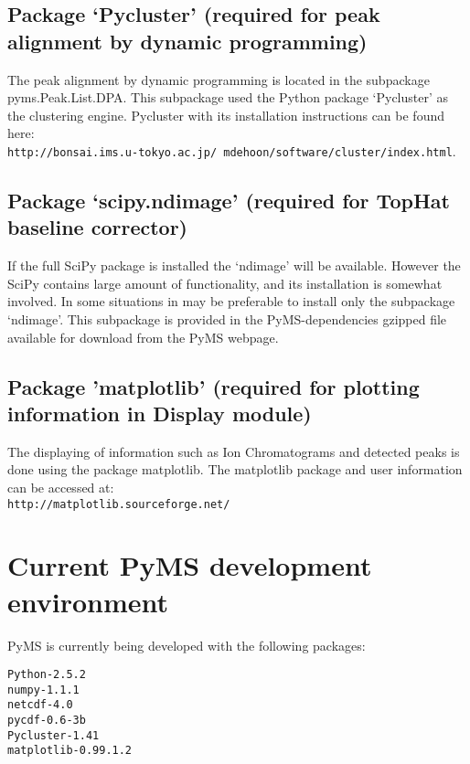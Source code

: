 \subsection{\label{subsec:pycluster}Package `Pycluster' (required for peak
alignment by dynamic programming)}

The peak alignment by dynamic programming is located in the subpackage
pyms.Peak.List.DPA. This subpackage used the Python package `Pycluster'
as the clustering engine. Pycluster with its installation instructions
can be found here:\\
{\tt http://bonsai.ims.u-tokyo.ac.jp/~mdehoon/software/cluster/index.html}.

\subsection{\label{subsec:scipy-ndmage}Package `scipy.ndimage' (required
for TopHat baseline corrector)}

If the full SciPy package is installed the `ndimage' will be available. However
the SciPy contains large amount of functionality, and its installation is
somewhat involved. In some situations in may be preferable to install only
the subpackage `ndimage'. This subpackage is provided in the PyMS-dependencies gzipped
file available for download from the PyMS webpage.

\subsection{\label{subsec:matplotlib}Package 'matplotlib' (required 
for plotting information in Display module)}

The displaying of information such as Ion Chromatograms and detected peaks
is done using the package matplotlib. The matplotlib package and user information
can be accessed at:\\
{\tt http://matplotlib.sourceforge.net/}

\section{Current PyMS development environment}

PyMS is currently being developed with the following packages:

\begin{verbatim}
Python-2.5.2
numpy-1.1.1
netcdf-4.0
pycdf-0.6-3b
Pycluster-1.41
matplotlib-0.99.1.2
\end{verbatim}

